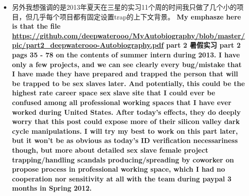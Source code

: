 \documentclass[9pt, b5paper]{article}
\begin{document}
\begin{enumerate}
\begin{enumerate}
\begin{itemize}
\item 另外我想强调的是2013年夏天在三星的实习11个周的时间我只做了几个小的项目，但几乎每个项目都有固定设置trap的上下文背景。 \textbf{My emphasze here is that the file \url{https://github.com/deepwaterooo/MyAutobiography/blob/master/pic/part2_deepwaterooo-Autobiography.pdf} part 2 暑假实习 part 2 pags 35 - 78 on the contents of summer intern during 2013. I have only a few projects, and we can see clearly every bug/mistake that I have made they have prepared and trapped the person that will be trapped to be sex slaves later. And potentially, this could be the highest rate career space sex slave site that I could ever be confused among all professional working spaces that I have ever worked during United States. After today's effects, they do deeply worry that this post could expose more of their silicon valley dark cycle manipulations. I will try my best to work on this part later, but it won't be as obvious as today's ID verification necessariness though, but more about detailed sex slave female project trapping/handling scandals producing/spreading by coworker on propose process in professional working space, which I had no cooperation nor sensitivity at all with the team during paypal 3 months in Spring 2012.}
\end{itemize}
\end{enumerate}


\end{enumerate}
\end{document}
